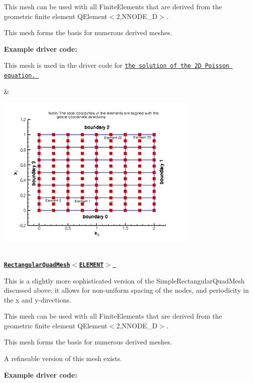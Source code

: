 \begin{center}
\begin{longtabu}
\begin{DoxyItemize}
\item This mesh can be used with all {\ttfamily Finite\+Elements} that are derived from the geometric finite element {\ttfamily Q\+Element$<$2,\+N\+N\+O\+D\+E\+\_\+D$>$}.
\item This mesh forms the basis for numerous derived meshes.
\end{DoxyItemize}{\bfseries Example driver code\+:} ~\newline

\begin{DoxyItemize}
\item This mesh is used in the driver code for \href{../../../poisson/two_d_poisson/html/index.html}{\tt the solution of the 2D Poisson equation. }
\end{DoxyItemize}& 
\begin{DoxyImageNoCaption}
  \mbox{\includegraphics[width=0.75\textwidth]{simple_rectangular_quadmesh}}
\end{DoxyImageNoCaption}
   \\
\href{classoomph_1_1RectangularQuadMesh.html}{\tt {\bfseries  Rectangular\+Quad\+Mesh$<$\+E\+L\+E\+M\+E\+N\+T$>$ }} ~\newline
~\newline

\begin{DoxyItemize}
\item This is a slightly more sophisticated version of the {\ttfamily Simple\+Rectangular\+Quad\+Mesh} discussed above; it allows for non-\/uniform spacing of the nodes, and periodicity in the x and y-\/directions.
\item This mesh can be used with all {\ttfamily Finite\+Elements} that are derived from the geometric finite element {\ttfamily Q\+Element$<$2,\+N\+N\+O\+D\+E\+\_\+D$>$}.
\item This mesh forms the basis for numerous derived meshes.
\item A refineable version of this mesh exists.
\end{DoxyItemize}{\bfseries Example driver code\+:} ~\newline


\end{longtabu}
\end{center}
